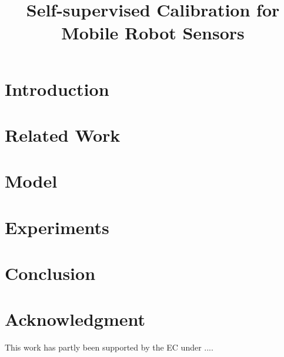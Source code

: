 \documentclass[letterpaper, 10 pt, conference]{sty/ieeeconf}
\begin{document}
\title{\LARGE \bf
Self-supervised Calibration for Mobile Robot Sensors
}

\author{
}

\maketitle

\begin{abstract}

\end{abstract}

\section{Introduction\label{intro}}


\section{Related Work\label{sec:rel}}


\section{Model\label{sec:model}}


\section{Experiments\label{sec:exp}}


\section{Conclusion\label{sec:conc}}


\section*{Acknowledgment}
This work has partly been supported by the EC under ....



\end{document}
